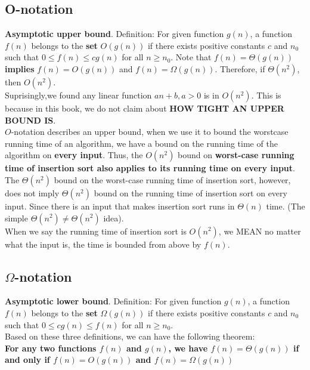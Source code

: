 \documentclass{article}
\begin{document}
\subsection*{O-notation}

\textbf{Asymptotic upper bound}. 
Definition: For given function $g(n)$, a function $f(n)$ belongs to the \textbf{set} $O(g(n))$ if there exists positive constants $c$ and $n_0$ such that $0 \leq f(n)\leq cg(n)$ for all $n \geq n_0$. Note that $f(n) = \Theta(g(n))$ \textbf{implies} $f(n) = O(g(n))$ and $f(n) = \Omega(g(n))$. Therefore, if $\Theta (n^2)$, then $O(n^2)$.\\

Suprisingly,we found any linear function $an+b, a>0$ is in $O(n^2)$. This is because in this book, we do not claim about \textbf{HOW TIGHT AN UPPER BOUND IS}. \\

$O$-notation describes an upper bound, when we use it to bound the worstcase
running time of an algorithm, we have a bound on the running time of the algorithm
on \textbf{every input}. Thus, the $O(n^2)$
bound on \textbf{worst-case running time of insertion sort also applies to its running time
on every input}. The $\Theta(n^2)$ bound on the worst-case running time of insertion sort,
however, does not imply $\Theta(n^2)$ bound on the running time of insertion sort on
every input. Since there is an input that makes insertion sort runs in $\Theta(n)$ time. (The simple $\Theta(n^2) \neq \Theta(n^2)$ idea).\\

When we say the running time of insertion sort is $O(n^2)$, we MEAN no matter what the input is, the time is bounded from above by $f(n)$.


\subsection*{$\Omega$-notation}
\textbf{Asymptotic lower bound}. 
Definition: For given function $g(n)$, a function $f(n)$ belongs to the \textbf{set} $\Omega(g(n))$ if there exists positive constants $c$ and $n_0$ such that $0 \leq cg(n) \leq f(n)$ for all $n \geq n_0$.\\

 Based on these three definitions, we can have the following theorem:\\
 {\color{blue}\small \textbf{For any two functions $f(n)$ and $g(n)$, we have $f(n) = \Theta(g(n))$ if and only if $f(n)= O(g(n))$ and $f(n) = \Omega(g(n))$}}\\
 
\end{document}
